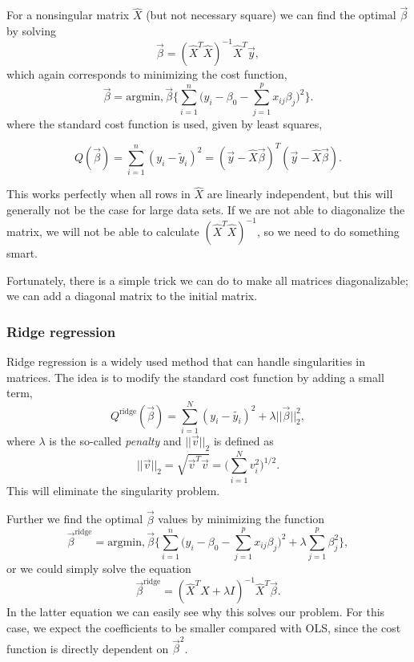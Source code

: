 For a nonsingular matrix $\hat{X}$ (but not necessary square) we can find the optimal $\vec{\beta}$ by solving
\begin{equation}
\vec{\beta}=(\hat{X}^T\hat{X})^{-1}\hat{X}^T\vec{y},
\end{equation}
which again corresponds to minimizing the cost function,
\begin{equation}
\vec{\beta}=\text{argmin},\vec{\beta}\bigg\{\sum_{i=1}^{n}\Big(y_i-\beta_0-\sum_{j=1}^px_{ij}\beta_j\Big)^2\bigg\}.
\end{equation}
where the standard cost function is used, given by least squares,

\begin{equation}
Q(\vec{\beta})=\sum_{i=1}^{n}(y_i-\tilde{y}_i)^2=(\vec{y}-\hat{X}\vec{\beta})^T(\vec{y}-\hat{X}\vec{\beta}).
\end{equation}

This works perfectly when all rows in $\hat{X}$ are linearly independent, but this will generally not be the case for large data sets. If we are not able to diagonalize the matrix, we will not be able to calculate $(\hat{X}^T\hat{X})^{-1}$, so we need to do something smart. 

Fortunately, there is a simple trick we can do to make all matrices diagonalizable; we can add a diagonal matrix to the initial matrix. 


\subsubsection{Ridge regression} \label{sec:ridge}
Ridge regression is a widely used method that can handle singularities in matrices. The idea is to modify the standard cost function by adding a small term,
\begin{equation}
Q^{\text{ridge}}(\vec{\beta})=\sum_{i=1}^N(y_i-\tilde{y_i})^2+\lambda||\vec{\beta}||_2^2,
\end{equation}
where $\lambda$ is the so-called \textit{penalty} and $||\vec{v}||_2$ is defined as
\begin{equation}
||\vec{v}||_2=\sqrt{\vec{v}^T\vec{v}}=\Big(\sum_{i=1}^Nv_i^2\Big)^{1/2}.
\end{equation}
This will eliminate the singularity problem.

Further we find the optimal $\vec{\beta}$ values by minimizing the function 
\begin{equation}
\vec{\beta}^{\text{ridge}}=\text{argmin},\vec{\beta}\bigg\{\sum_{i=1}^{n}\Big(y_i-\beta_0-\sum_{j=1}^px_{ij}\beta_j\Big)^2+\lambda\sum_{j=1}^p\beta_j^2\bigg\}, 
\end{equation}
or we could simply solve the equation
\begin{equation}
\vec{\beta}^{\text{ridge}}=(\hat{X}^T\hat{X}+\lambda I)^{-1}\hat{X}^T\vec{\beta}.
\end{equation}
In the latter equation we can easily see why this solves our problem. For this case, we expect the coefficients to be smaller compared with OLS, since the cost function is directly dependent on $\vec{\beta}^2$.

